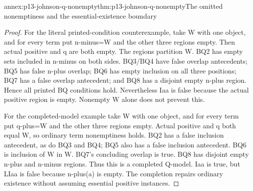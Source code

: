 \begin{annexitem}{annex:p13-johnson-q-nonempty}{thm:p13-johnson-q-nonempty}{The omitted nonemptiness and the essential-existence boundary}
\begin{proof}
For the literal printed-condition counterexample, take W with one object,
and for every term put n-minus=W and the other three regions empty.
Then actual positive and q are both empty. The regions partition W.
BQ2 has empty sets included in n-minus on both sides. BQ3/BQ4
have false overlap antecedents; BQ5 has false n-plus overlap; BQ6
has empty inclusion on all three positions; BQ7 has a false overlap
antecedent; and BQ8 has a disjoint empty n-plus region. Hence all
printed BQ conditions hold. Nevertheless Iaa is false because the
actual positive region is empty. Nonempty W alone does not prevent this.

For the completed-model example take W with one object, and for every
term put q-plus=W and the other three regions empty. Actual positive
and q both equal W, so ordinary term nonemptiness holds. BQ2 has a
false inclusion antecedent, as do BQ3 and BQ4; BQ5 also has a false
inclusion antecedent. BQ6 is inclusion of W in W. BQ7's concluding
overlap is true. BQ8 has disjoint empty n-plus and n-minus regions.
Thus this is a completed Q-model. Iaa is true, but LIaa is false
because n-plus(a) is empty. The completion repairs ordinary existence
without assuming essential positive instances.
\end{proof}
\end{annexitem}

